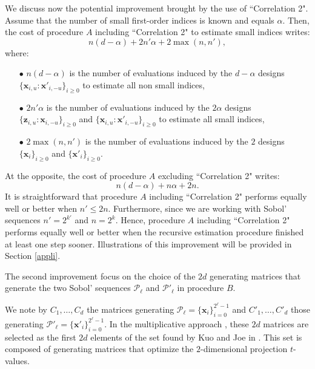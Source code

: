 \documentclass[]{elsarticle}
\theoremstyle{definition}
\newcommand{\bvec}[1]{\boldsymbol{#1}}
\newcommand{\vx}{\bvec{x}}
\newcommand{\vz}{\bvec{z}}
\begin{document}
We discuss now the potential improvement brought by the use of ``Correlation 2". Assume that the number of small first-order indices is known and equals $\alpha$. Then, the cost of procedure $A$ including ``Correlation 2" to estimate small indices writes: 
\[ n(d-\alpha) + 2 n'\alpha + 2\max(n,n'),\]
where: \begin{itemize}
\item[$\bullet$] $n(d-\alpha)$ is the number of evaluations induced by the $d-\alpha$ designs $\{\vx_{i,u}:{\vx'}_{i,-u}\}_{i\geq0}$ to estimate all non small indices, 
\item[$\bullet$] $2 n'\alpha$ is the number of evaluations induced by the $2\alpha$ designs $\{\vz_{i,u}:\vx_{i,-u}\}_{i\geq0}$ and $\{\vx_{i,u}:{\vx'}_{i,-u}\}_{i\geq0}$ to estimate all small indices,
\item[$\bullet$] $2\max(n,n')$ is the number of evaluations  induced by the $2$ designs $\{\vx_{i}\}_{i\geq0}$ and $\{{\vx'}_{i}\}_{i\geq0}$.
\end{itemize}
At the opposite, the cost of procedure $A$ excluding ``Correlation 2" writes: 
\[ n(d-\alpha) + n\alpha + 2n.\]
It is straightforward that procedure $A$ including ``Correlation 2" performs equally well or better when $n' \leq 2n$. Furthermore, since we are working with Sobol' sequences $n'=2^{k'}$ and $n=2^{k}$. Hence, procedure $A$ including ``Correlation 2" performs equally well or better when the recursive estimation procedure finished at least one step sooner. Illustrations of this improvement will be provided in Section \ref{appli}.

\bigskip

The second improvement focus on the choice of the $2d$ generating matrices that generate the two Sobol' sequences $\mathcal{P}_\ell$  and ${\mathcal{P}'}_\ell$ in procedure $B$.

We note by $C_1,\dots,C_d$ the matrices generating $\mathcal{P}_\ell=\{\vx_i\}_{i=0}^{2^\ell-1}$ and ${C'}_1,\dots,{C'}_d$ those generating $\mathcal{P}'_\ell=\{{\vx'}_i\}_{i=0}^{2^\ell-1}$.
In the multiplicative approach \cite{crass}, these $2d$ matrices are selected as the first $2d$ elements of the set found by Kuo and Joe in \cite{Kuo}. This set is composed of generating matrices that optimize the $2$-dimensional projection $t$-values. 

\end{document}
